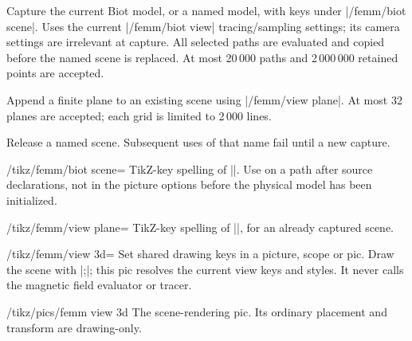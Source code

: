 \begin{command}{\femmbiotscene{}}
Capture the current Biot model, or a named model, with keys under
|/femm/biot scene|. Uses the current |/femm/biot view| tracing/sampling settings;
its camera settings are irrelevant at capture. All selected paths are evaluated
and copied before the named scene is replaced. At most 20\,000 paths and
2\,000\,000 retained points are accepted.
\end{command}
\begin{command}{\femmviewplane{}}
Append a finite plane to an existing scene using |/femm/view plane|.
At most 32 planes are accepted; each grid is limited to 2\,000 lines.
\end{command}
\begin{command}{\femmviewclear{}}
Release a named scene. Subsequent uses of that name fail until a new capture.
\end{command}
\begin{key}{/tikz/femm/biot scene=}
TikZ-key spelling of |\femmbiotscene|. Use on a path after source declarations,
not in the picture options before the physical model has been initialized.
\end{key}
\begin{key}{/tikz/femm/view plane=}
TikZ-key spelling of |\femmviewplane|, for an already captured scene.
\end{key}
\begin{key}{/tikz/femm/view 3d=}
Set shared drawing keys in a picture, scope or pic. Draw the scene with
|;|; this pic resolves the current view keys and styles.
It never calls the magnetic field evaluator or tracer.
\end{key}
\begin{key}{/tikz/pics/femm view 3d}
The scene-rendering pic. Its ordinary placement and transform are drawing-only.
\end{key}

